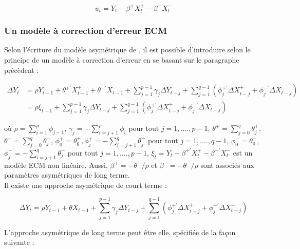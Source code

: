 \begin{sloppypar}
\begin{equation}
  u_t = Y_t - \beta^+ X_t^+ - \beta^- X_t^-   
\end{equation}

\subsubsection*{Un modèle à correction d'erreur ECM}

Selon l'écriture du modèle asymétrique de \cite{Shin}, il est possible d'introduire selon le principe de \cite{Pesaran} un modèle à correction d'erreur en se basant sur le paragraphe précèdent :

\begin{equation}
\begin{split}
    \Delta Y_t &= \rho Y_{t-1} + \theta^{+'} X^+_{t-1} + \theta^{-'} X_{t-1}^- + \sum_{j=1}^{p-1} \gamma_j \Delta Y_{t-j} + \sum_{j=1}^{q-1} \left ( \phi_j^{+'} \Delta X^+_{t-j} + \phi_j^{-'} \Delta X^-_{t-j} \right ) \\  
    & = \rho \xi_{t-1} + \sum_{j=1}^{p-1} \gamma_j \Delta Y_{t-j} + \sum_{j=1}^{q-1} \left ( \phi_j^{+'} \Delta X^+_{t-j} + \phi_j^{-'} \Delta X^-_{t-j} \right )
\end{split}
\end{equation}

où $\rho = \displaystyle{\sum_{i=1}^p} \phi_{j-1}$, $\gamma_j = -  \displaystyle{\sum_{i=j+1}^p} \phi_i$ pour tout $j = 1, ...., p-1$, $\theta^+ = \displaystyle{\sum_{j=0}^q} \theta_j^+$,  $\theta^- =  \displaystyle{\sum_{j=0}^q} \theta_j^-$, $\phi_0^{+} = \theta_0^+, \phi_j^+ = - \displaystyle{\sum_{i=j+1}^q \theta_j^+}$ pour tout $j = 1, ...., q-1$, $\phi_0^- = \theta_0^-$, $\phi^-_j = -\displaystyle{\sum_{i=j+1}^q} \theta_j^-$ pour tout $j = 1, ...., p-1$, $\xi_t = Y_t - \beta^{+'} X_t^+ - \beta^{-'} X_t^-$ est un modèle ECM non linéaire. Aussi, $\beta^+ = - \theta^+/\rho$ et $\beta^- = - \theta^-/\rho$ sont associés aux paramètres asymétriques de long terme.\\

Il existe une approche asymétrique de court terme :

\begin{equation}
    \Delta Y_t = \rho Y_{t-1} + \theta X_{t-1} + \sum_{j=1}^{p-1} \gamma_j \Delta Y_{t-j} + \sum_{j=1}^{q-1} \left ( \phi_j^{+'} \Delta X^+_{t-j} + \phi_j^{-'} \Delta X^-_{t-j} \right )   
\end{equation}

L'approche asymétrique de long terme peut être elle, spécifiée de la façon suivante : 


\end{sloppypar}

